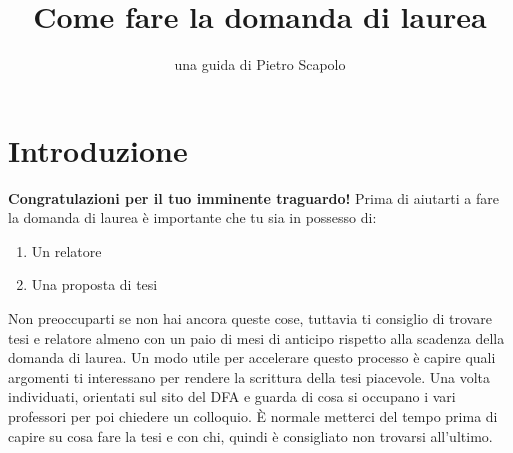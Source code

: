 \documentclass[12pt]{article}
\title{Come fare la domanda di laurea}
\author{una guida di Pietro Scapolo}
\date{\noindent}
\begin{document}
\maketitle

\vspace{\fill}
\section*{Introduzione}
\textbf{Congratulazioni per il tuo imminente traguardo!} Prima di aiutarti a fare la domanda di laurea è importante che tu sia in possesso di:
\begin{enumerate}
	\item Un relatore
	\item Una proposta di tesi
\end{enumerate}
Non preoccuparti se non hai ancora queste cose, tuttavia ti consiglio di trovare tesi e relatore almeno con un paio di mesi di anticipo rispetto alla scadenza della domanda di laurea. Un modo utile per accelerare questo processo è capire quali argomenti ti interessano per rendere la scrittura della tesi piacevole. Una volta individuati, orientati sul sito del DFA e guarda di cosa si occupano i vari professori per poi chiedere un colloquio. È normale metterci del tempo prima di capire su cosa fare la tesi e con chi, quindi è consigliato non trovarsi all'ultimo.
\vspace{\fill}

\newpage
\end{document}
